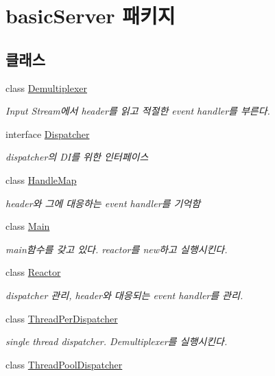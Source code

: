 \hypertarget{namespacebasic_server}{\section{basic\+Server 패키지}
\label{namespacebasic_server}
}
\subsection*{클래스}
\begin{DoxyCompactItemize}
\item 
class \hyperlink{classbasic_server_1_1_demultiplexer}{Demultiplexer}
\begin{DoxyCompactList}\small\item\em Input Stream에서 header를 읽고 적절한 event handler를 부른다. \end{DoxyCompactList}\item 
interface \hyperlink{interfacebasic_server_1_1_dispatcher}{Dispatcher}
\begin{DoxyCompactList}\small\item\em dispatcher의 D\+I를 위한 인터페이스 \end{DoxyCompactList}\item 
class \hyperlink{classbasic_server_1_1_handle_map}{Handle\+Map}
\begin{DoxyCompactList}\small\item\em header와 그에 대응하는 event handler를 기억함 \end{DoxyCompactList}\item 
class \hyperlink{classbasic_server_1_1_main}{Main}
\begin{DoxyCompactList}\small\item\em main함수를 갖고 있다. reactor를 new하고 실행시킨다. \end{DoxyCompactList}\item 
class \hyperlink{classbasic_server_1_1_reactor}{Reactor}
\begin{DoxyCompactList}\small\item\em dispatcher 관리, header와 대응되는 event handler를 관리. \end{DoxyCompactList}\item 
class \hyperlink{classbasic_server_1_1_thread_per_dispatcher}{Thread\+Per\+Dispatcher}
\begin{DoxyCompactList}\small\item\em single thread dispatcher. Demultiplexer를 실행시킨다. \end{DoxyCompactList}\item 
class \hyperlink{classbasic_server_1_1_thread_pool_dispatcher}{Thread\+Pool\+Dispatcher}
\end{DoxyCompactItemize}
